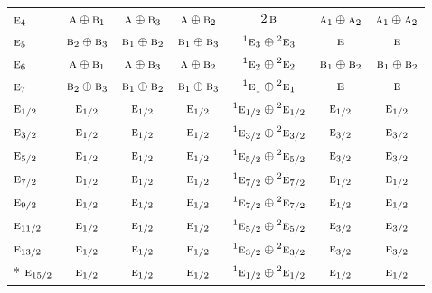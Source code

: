 \documentclass[10pt,a4paper]{article}
\numberwithin{equation}{section}
\newcommand{\irr}[1]{\text{\normalfont\scshape #1}}
\newcommand{\conjpair}[1]{{}^{#1}}
\begin{document}
{\begin{longtable}{@{}lcccccc@{}}
$\irr{e}_{4}$ & $\irr{a}\oplus \irr{b}_{1}$ & $\irr{a}\oplus \irr{b}_{3}$ & $\irr{a}\oplus \irr{b}_{2}$ & $2\,\irr{b}$ & $\irr{a}_{1}\oplus \irr{a}_{2}$ & $\irr{a}_{1}\oplus \irr{a}_{2}$\\
$\irr{e}_{5}$ & $\irr{b}_{2}\oplus \irr{b}_{3}$ & $\irr{b}_{1}\oplus \irr{b}_{2}$ & $\irr{b}_{1}\oplus \irr{b}_{3}$ & $\conjpair{1}\irr{e}_{3}\oplus \conjpair{2}\irr{e}_{3}$ & $\irr{e}$ & $\irr{e}$\\
$\irr{e}_{6}$ & $\irr{a}\oplus \irr{b}_{1}$ & $\irr{a}\oplus \irr{b}_{3}$ & $\irr{a}\oplus \irr{b}_{2}$ & $\conjpair{1}\irr{e}_{2}\oplus \conjpair{2}\irr{e}_{2}$ & $\irr{b}_{1}\oplus \irr{b}_{2}$ & $\irr{b}_{1}\oplus \irr{b}_{2}$\\
$\irr{e}_{7}$ & $\irr{b}_{2}\oplus \irr{b}_{3}$ & $\irr{b}_{1}\oplus \irr{b}_{2}$ & $\irr{b}_{1}\oplus \irr{b}_{3}$ & $\conjpair{1}\irr{e}_{1}\oplus \conjpair{2}\irr{e}_{1}$ & $\irr{e}$ & $\irr{e}$\\
$\irr{e}_{1/2}$ & $\irr{e}_{1/2}$ & $\irr{e}_{1/2}$ & $\irr{e}_{1/2}$ & $\conjpair{1}\irr{e}_{1/2}\oplus \conjpair{2}\irr{e}_{1/2}$ & $\irr{e}_{1/2}$ & $\irr{e}_{1/2}$\\
$\irr{e}_{3/2}$ & $\irr{e}_{1/2}$ & $\irr{e}_{1/2}$ & $\irr{e}_{1/2}$ & $\conjpair{1}\irr{e}_{3/2}\oplus \conjpair{2}\irr{e}_{3/2}$ & $\irr{e}_{3/2}$ & $\irr{e}_{3/2}$\\
$\irr{e}_{5/2}$ & $\irr{e}_{1/2}$ & $\irr{e}_{1/2}$ & $\irr{e}_{1/2}$ & $\conjpair{1}\irr{e}_{5/2}\oplus \conjpair{2}\irr{e}_{5/2}$ & $\irr{e}_{3/2}$ & $\irr{e}_{3/2}$\\
$\irr{e}_{7/2}$ & $\irr{e}_{1/2}$ & $\irr{e}_{1/2}$ & $\irr{e}_{1/2}$ & $\conjpair{1}\irr{e}_{7/2}\oplus \conjpair{2}\irr{e}_{7/2}$ & $\irr{e}_{1/2}$ & $\irr{e}_{1/2}$\\
$\irr{e}_{9/2}$ & $\irr{e}_{1/2}$ & $\irr{e}_{1/2}$ & $\irr{e}_{1/2}$ & $\conjpair{1}\irr{e}_{7/2}\oplus \conjpair{2}\irr{e}_{7/2}$ & $\irr{e}_{1/2}$ & $\irr{e}_{1/2}$\\
$\irr{e}_{11/2}$ & $\irr{e}_{1/2}$ & $\irr{e}_{1/2}$ & $\irr{e}_{1/2}$ & $\conjpair{1}\irr{e}_{5/2}\oplus \conjpair{2}\irr{e}_{5/2}$ & $\irr{e}_{3/2}$ & $\irr{e}_{3/2}$\\
$\irr{e}_{13/2}$ & $\irr{e}_{1/2}$ & $\irr{e}_{1/2}$ & $\irr{e}_{1/2}$ & $\conjpair{1}\irr{e}_{3/2}\oplus \conjpair{2}\irr{e}_{3/2}$ & $\irr{e}_{3/2}$ & $\irr{e}_{3/2}$\\*
$\irr{e}_{15/2}$ & $\irr{e}_{1/2}$ & $\irr{e}_{1/2}$ & $\irr{e}_{1/2}$ & $\conjpair{1}\irr{e}_{1/2}\oplus \conjpair{2}\irr{e}_{1/2}$ & $\irr{e}_{1/2}$ & $\irr{e}_{1/2}$\\
\bottomrule\end{longtable}}
\end{document}
